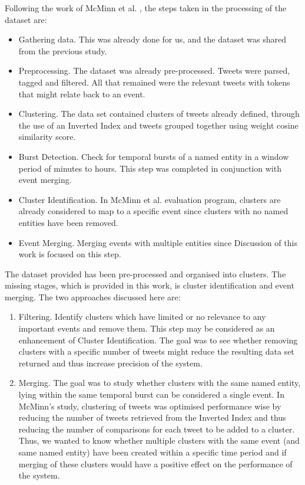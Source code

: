 \documentclass[a4paper,portrait,12pt]{article}
\begin{document}
Following the work of McMinn et al. \cite{McMinn2013}, the steps taken in the processing of the dataset are:
\begin{itemize}
	\item Gathering data. This was already done for us, and the dataset was shared from the previous study.
	\item Preprocessing. The dataset was already pre-processed. Tweets were parsed, tagged and filtered. All that remained were the relevant tweets with tokens that might relate back to an event.
	\item Clustering. The data set contained clusters of tweets already defined, through the use of an Inverted Index and tweets grouped together using weight cosine similarity score.
	\item Burst Detection. Check for temporal bursts of a named entity in a window period of minutes to hours. This step was completed in conjunction with event merging.
	\item Cluster Identification. In McMinn et al. \cite{McMinn2013} evaluation program, clusters are already considered to map to a specific event since clusters with no named entities have been removed.
	\item Event Merging. Merging events with multiple entities since  Discussion of this work is focused on this step.
\end{itemize}

The dataset provided has been pre-processed and organised into clusters.
The missing stages, which is provided in this work, is cluster identification and event merging.
The two approaches discussed here are:
\begin{enumerate}
	\item Filtering.
	      Identify clusters which have limited or no relevance to any important events and remove them.
	      This step may be considered as an enhancement of Cluster Identification.
	      The goal was to see whether removing clusters with a specific number of tweets might reduce the resulting data set returned and thus increase precision of the system.
	\item Merging.
	      The goal was to study whether clusters with the same named entity, lying within the same temporal burst can be considered a single event.
	      In McMinn's study, clustering of tweets was optimised performance wise by reducing the number of tweets retrieved from the Inverted Index and thus reducing the number of comparisons for each tweet to be added to a cluster.
	      Thus, we wanted to know whether multiple clusters with the same event (and same named entity) have been created within a specific time period and if merging of these clusters would have a positive effect on the performance of the system.
\end{enumerate}
\end{document}
